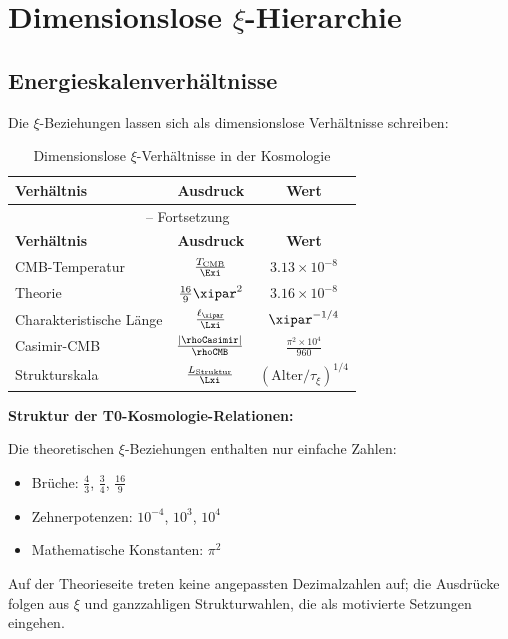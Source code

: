 	\section{Dimensionslose $\xi$-Hierarchie}
	
	\subsection{Energieskalenverhältnisse}
	
	Die $\xi$-Beziehungen lassen sich als dimensionslose Verhältnisse schreiben:
	
	\begin{longtable}{lcc}
		\caption{Dimensionslose $\xi$-Verhältnisse in der Kosmologie} \\
		\toprule
		\textbf{Verhältnis} & \textbf{Ausdruck} & \textbf{Wert} \\
		\midrule
		\endfirsthead
		\multicolumn{3}{c}{\tablename\ \thetable{} -- Fortsetzung} \\
		\toprule
		\textbf{Verhältnis} & \textbf{Ausdruck} & \textbf{Wert} \\
		\midrule
		\endhead
		CMB-Temperatur & $\frac{T_{\text{CMB}}}{\Exi}$ & $3.13 \times 10^{-8}$ \\
		Theorie & $\frac{16}{9}\xipar^2$ & $3.16 \times 10^{-8}$ \\
		Charakteristische Länge & $\frac{\ell_{\xipar}}{\Lxi}$ & $\xipar^{-1/4}$ \\
		Casimir-CMB & $\frac{|\rhoCasimir|}{\rhoCMB}$ & $\frac{\pi^2 \times 10^4}{960}$ \\
		Strukturskala & $\frac{L_{\text{Struktur}}}{\Lxi}$ & $(\text{Alter}/\tau_\xi)^{1/4}$ \\
		\bottomrule
	\end{longtable}
	
	\begin{warning}
		\textbf{Struktur der T0-Kosmologie-Relationen:}
		
		Die theoretischen $\xi$-Beziehungen enthalten nur einfache Zahlen:
		\begin{itemize}
			\item Brüche: $\frac{4}{3}$, $\frac{3}{4}$, $\frac{16}{9}$
			\item Zehnerpotenzen: $10^{-4}$, $10^3$, $10^4$
			\item Mathematische Konstanten: $\pi^2$
		\end{itemize}
		
		Auf der Theorieseite treten keine angepassten Dezimalzahlen auf; die Ausdrücke folgen aus $\xi$ und ganzzahligen Strukturwahlen, die als motivierte Setzungen eingehen.
	\end{warning}
	
